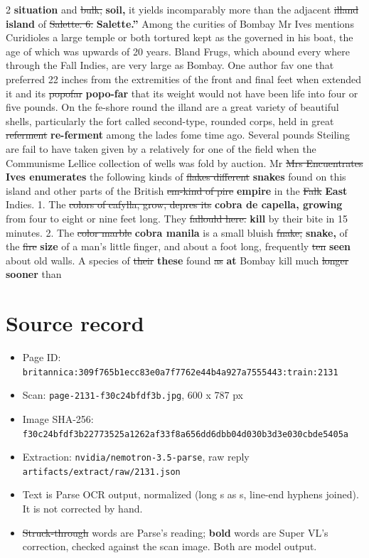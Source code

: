 \documentclass[10pt]{article}
\begin{document}
\begin{multicols}{2}
\textbf{situation} and \sout{bulk,} \textbf{soil,} it yields incomparably more than the adjacent \sout{illand} \textbf{island} of \sout{Salette. 6.} \textbf{Salette.”} Among the curities of Bombay Mr Ives mentions Curidioles a large temple or both tortured kept as the governed in his boat, the age of which was upwards of 20 years. Bland Frugs, which abound every where through the Fall Indies, are very large as Bombay. One author fav one that preferred 22 inches from the extremities of the front and final feet when extended it and its \sout{popofar} \textbf{popo-far} that its weight would not have been life into four or five pounds. On the fe-shore round the illand are a great variety of beautiful shells, particularly the fort called second-type, rounded corps, held in great \sout{referment} \textbf{re-ferment} among the lades fome time ago. Several pounds Steiling are fail to have taken given by a relatively for one of the field when the Communisme Lellice collection of wells was fold by auction. Mr \sout{Mrs Encuentrates} \textbf{Ives enumerates} the following kinds of \sout{flakes different} \textbf{snakes} found on this island and other parts of the British \sout{em-kind of pire} \textbf{empire} in the \sout{Falk} \textbf{East} Indies. 1. The \sout{colors of cafylla, grow, depres its} \textbf{cobra de capella, growing} from four to eight or nine feet long. They \sout{fallould here.} \textbf{kill} by their bite in 15 minutes. 2. The \sout{color marble} \textbf{cobra manila} is a small bluish \sout{fnake,} \textbf{snake,} of the \sout{fire} \textbf{size} of a man's little finger, and about a foot long, frequently \sout{ten} \textbf{seen} about old walls. A species of \sout{their} \textbf{these} found \sout{as} \textbf{at} Bombay kill much \sout{longer} \textbf{sooner} than
\end{multicols}
\section*{Source record}
\begin{itemize}
\item Page ID: \texttt{britannica:309f765b1ecc83e0a7f7762e44b4a927a7555443:train:2131}
\item Scan: \texttt{page-2131-f30c24bfdf3b.jpg}, 600 x 787 px
\item Image SHA-256: \texttt{\small f30c24bfdf3b22773525a1262af33f8a656dd6dbb04d030b3d3e030cbde5405a}
\item Extraction: \texttt{nvidia/nemotron-3.5-parse}, raw reply \texttt{artifacts/extract/raw/2131.json}
\item Text is Parse OCR output, normalized (long s as s, line-end hyphens joined). It is not corrected by hand.
\item \sout{Struck-through} words are Parse's reading; \textbf{bold} words are Super VL's correction, checked against the scan image. Both are model output.
\end{itemize}
\end{document}
